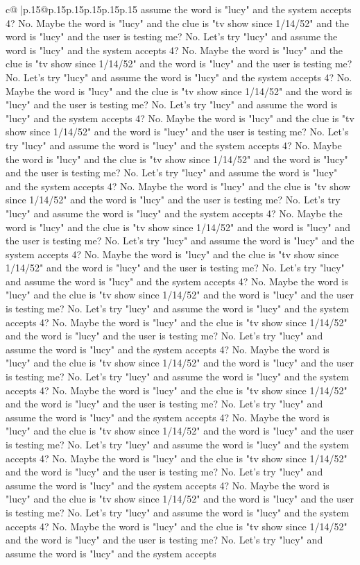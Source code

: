 \documentclass{article}
\begin{document}
{\begin{supertabular}{c@{$\;$}|p{.15\linewidth}@{}p{.15\linewidth}p{.15\linewidth}p{.15\linewidth}p{.15\linewidth}p{.15\linewidth}}
{{{assume the word is "lucy" and the system accepts 4? No. Maybe the word is "lucy" and the clue is "tv show since 1/14/52" and the word is "lucy" and the user is testing me? No. Let's try "lucy" and assume the word is "lucy" and the system accepts 4? No. Maybe the word is "lucy" and the clue is "tv show since 1/14/52" and the word is "lucy" and the user is testing me? No. Let's try "lucy" and assume the word is "lucy" and the system accepts 4? No. Maybe the word is "lucy" and the clue is "tv show since 1/14/52" and the word is "lucy" and the user is testing me? No. Let's try "lucy" and assume the word is "lucy" and the system accepts 4? No. Maybe the word is "lucy" and the clue is "tv show since 1/14/52" and the word is "lucy" and the user is testing me? No. Let's try "lucy" and assume the word is "lucy" and the system accepts 4? No. Maybe the word is "lucy" and the clue is "tv show since 1/14/52" and the word is "lucy" and the user is testing me? No. Let's try "lucy" and assume the word is "lucy" and the system accepts 4? No. Maybe the word is "lucy" and the clue is "tv show since 1/14/52" and the word is "lucy" and the user is testing me? No. Let's try "lucy" and assume the word is "lucy" and the system accepts 4? No. Maybe the word is "lucy" and the clue is "tv show since 1/14/52" and the word is "lucy" and the user is testing me? No. Let's try "lucy" and assume the word is "lucy" and the system accepts 4? No. Maybe the word is "lucy" and the clue is "tv show since 1/14/52" and the word is "lucy" and the user is testing me? No. Let's try "lucy" and assume the word is "lucy" and the system accepts 4? No. Maybe the word is "lucy" and the clue is "tv show since 1/14/52" and the word is "lucy" and the user is testing me? No. Let's try "lucy" and assume the word is "lucy" and the system accepts 4? No. Maybe the word is "lucy" and the clue is "tv show since 1/14/52" and the word is "lucy" and the user is testing me? No. Let's try "lucy" and assume the word is "lucy" and the system accepts 4? No. Maybe the word is "lucy" and the clue is "tv show since 1/14/52" and the word is "lucy" and the user is testing me? No. Let's try "lucy" and assume the word is "lucy" and the system accepts 4? No. Maybe the word is "lucy" and the clue is "tv show since 1/14/52" and the word is "lucy" and the user is testing me? No. Let's try "lucy" and assume the word is "lucy" and the system accepts 4? No. Maybe the word is "lucy" and the clue is "tv show since 1/14/52" and the word is "lucy" and the user is testing me? No. Let's try "lucy" and assume the word is "lucy" and the system accepts 4? No. Maybe the word is "lucy" and the clue is "tv show since 1/14/52" and the word is "lucy" and the user is testing me? No. Let's try "lucy" and assume the word is "lucy" and the system accepts 4? No. Maybe the word is "lucy" and the clue is "tv show since 1/14/52" and the word is "lucy" and the user is testing me? No. Let's try "lucy" and assume the word is "lucy" and the system accepts 4? No. Maybe the word is "lucy" and the clue is "tv show since 1/14/52" and the word is "lucy" and the user is testing me? No. Let's try "lucy" and assume the word is "lucy" and the system accepts }}}
\end{supertabular}}
\end{document}
